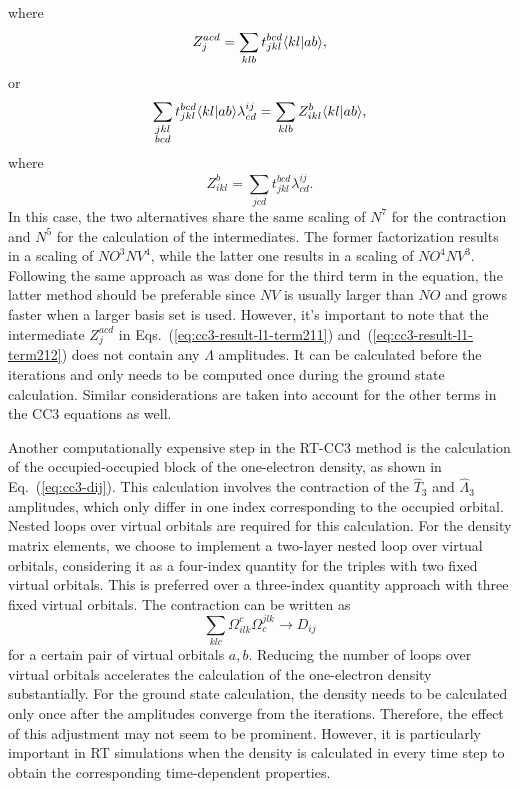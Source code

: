 where
\begin{equation}
Z_{j}^{acd} =\sum_{klb} t_{jkl}^{bcd}\langle kl |ab \rangle,
\label{eq:cc3-result-l1-term212}
\end{equation}
or
\begin{equation}
\sum\limits_{\substack{jkl\\bcd}}t_{jkl}^{bcd}\langle kl |ab \rangle \lambda_{cd}^{ij}=\sum_{klb}Z_{ikl}^{b}\langle kl |ab \rangle,
\end{equation}
where
\begin{equation}
Z_{ikl}^{b} = \sum_{jcd}t_{jkl}^{bcd} \lambda_{cd}^{ij}.
\end{equation}
In this case, the two alternatives share the same scaling of $N^{7}$ for the contraction and $N^{5}$ for the calculation of the intermediates. The former factorization results in a scaling of $NO^{3}NV^{4}$, while the latter one results in a scaling of $NO^{4}NV^{3}$. Following the same approach as was done for the third term in the equation, the latter method should be preferable since $NV$ is usually larger than $NO$ and grows faster when a larger basis set is used. However, it's important to note that the intermediate $Z_{j}^{acd}$ in Eqs.~(\ref{eq:cc3-result-l1-term211}) and~(\ref{eq:cc3-result-l1-term212}) does not contain any $\hat{\Lambda}$ amplitudes. It can be calculated before the iterations and only needs to be computed once during the ground state calculation. Similar considerations are taken into account for the other terms in the CC3 equations as well.

Another computationally expensive step in the RT-CC3 method is the calculation of the occupied-occupied block of the one-electron density, as shown in Eq.~(\ref{eq:cc3-dij}). This calculation involves the contraction of the $\hat{T}_{3}$ and $\hat{\Lambda}_{3}$ amplitudes, which only differ in one index corresponding to the occupied orbital. Nested loops over virtual orbitals are required for this calculation. For the density matrix elements, we choose to implement a two-layer nested loop over virtual orbitals, considering it as a four-index quantity for the triples with two fixed virtual orbitals. This is preferred over a three-index quantity approach with three fixed virtual orbitals. The contraction can be written as
\begin{equation}
\sum_{klc}\Omega_{ilk}^{c}\Omega_{c}^{jlk} \rightarrow D_{ij}
\end{equation}
for a certain pair of virtual orbitals $a,b$. Reducing the number of loops over virtual orbitals accelerates the calculation of the one-electron density substantially. For the ground state calculation, the density needs to be calculated only once after the amplitudes converge from the iterations. Therefore, the effect of this adjustment may not seem to be prominent. However, it is particularly important in RT simulations when the density is calculated in every time step to obtain the corresponding time-dependent properties.

